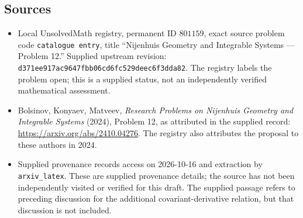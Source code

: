 \documentclass[11pt]{article}
\begin{document}
\subsection{Sources}
\begin{itemize}
\item Local UnsolvedMath registry, permanent ID \(801159\), exact source problem code \texttt{catalogue entry}, title ``Nijenhuis Geometry and Integrable Systems --- Problem 12.'' Supplied upstream revision: \texttt{d371ee917ac9647fbb06cd6fc529deec6f3dda82}. The registry labels the problem open; this is a supplied status, not an independently verified mathematical assessment.
\item Bolsinov, Konyaev, Matveev, \emph{Research Problems on Nijenhuis Geometry and Integrable Systems} (2024), Problem 12, as attributed in the supplied record: \url{https://arxiv.org/abs/2410.04276}. The registry also attributes the proposal to these authors in 2024.
\item Supplied provenance records access on 2026-10-16 and extraction by \texttt{arxiv\_latex}. These are supplied provenance details; the source has not been independently visited or verified for this draft. The supplied passage refers to preceding discussion for the additional covariant-derivative relation, but that discussion is not included.
\end{itemize}
\end{document}
